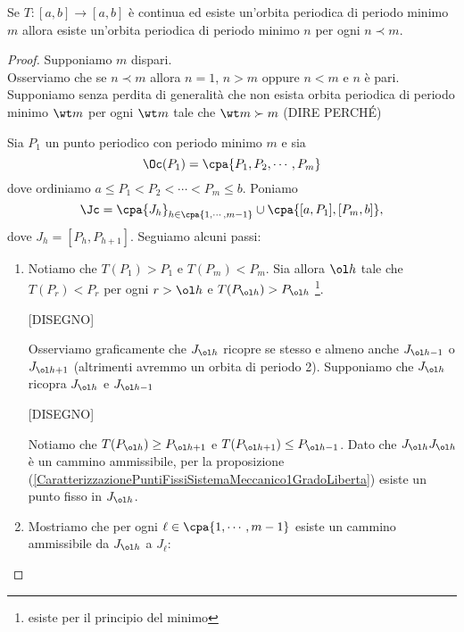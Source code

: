 \begin{theorem}[Sharkovsky]\label{TeoremaSharkovsky}
Se $T:[a,b]\to [a,b]$ \`e continua ed esiste un'orbita periodica di periodo minimo $m$ allora esiste un'orbita periodica di periodo minimo $n$ per ogni $n\prec m$.
\end{theorem}
\begin{proof}
Supponiamo $m$ dispari.\\
Osserviamo che se $n\prec m$ allora $n=1$, $n>m$ oppure $n<m$ e $n$ \`e pari. Supponiamo senza perdita di generalit\`a che non esista orbita periodica di periodo minimo $\wt m$ per ogni $\wt m$ tale che $\wt m\succ m$ (DIRE PERCH\'E)

Sia $P_1$ un punto periodico con periodo minimo $m$ e sia
\[\Oc(P_1)=\cpa{P_1,P_2,\cdots, P_m}\]
dove ordiniamo $a\leq P_1<P_2<\cdots<P_m\leq b$. Poniamo
\[\Jc=\cpa{J_h}_{h\in\cpa{1,\cdots, m-1}}\cup \cpa{[a,P_1], [P_m,b]},\]
dove $J_h=[P_h,P_{h+1}]$. Seguiamo alcuni passi:
\setlength{\leftmargini}{0cm}
\begin{enumerate}
\item Notiamo che $T(P_1)>P_1$ e $T(P_m)<P_m$. Sia allora $\ol h$ tale che $T(P_r)<P_r$ per ogni $r>\ol h$ e $T(P_{\ol h})>P_{\ol h}$ \footnote{esiste per il principio del minimo}. 

[DISEGNO]

Osserviamo graficamente che $J_{\ol h}$ ricopre se stesso e almeno anche $J_{\ol h-1}$ o $J_{\ol h+1}$ (altrimenti avremmo un orbita di periodo 2). Supponiamo che $J_{\ol h}$ ricopra $J_{\ol h}$ e $J_{\ol h-1}$

[DISEGNO]

Notiamo che $T(P_{\ol h})\geq P_{\ol h+1}$ e $T(P_{\ol h+1})\leq P_{\ol h-1}$. Dato che $J_{\ol h}J_{\ol h}$ \`e un cammino ammissibile, per la proposizione (\ref{CaratterizzazionePuntiFissiSistemaMeccanico1GradoLiberta}) esiste un punto fisso in $J_{\ol h}$.
\item Mostriamo che per ogni $\ell\in \cpa{1,\cdots, m-1}$ esiste un cammino ammissibile da $J_{\ol h}$ a $J_{\ell}$:


\end{enumerate}
\end{proof}
